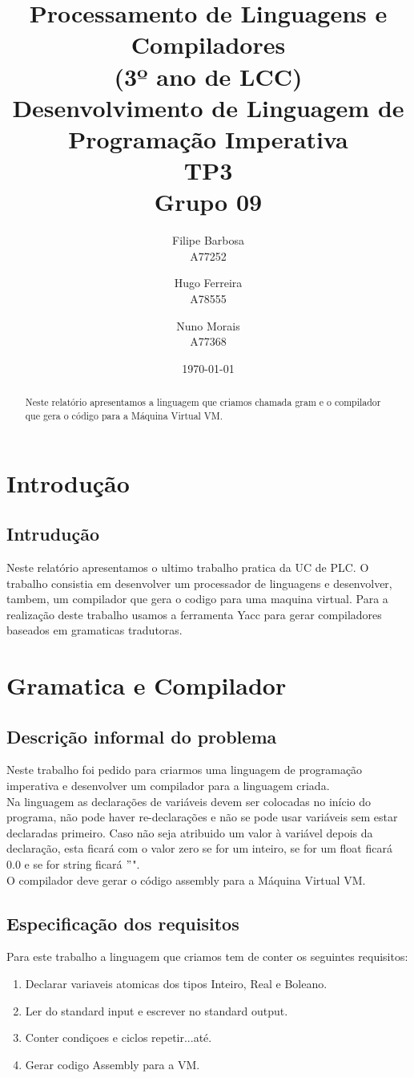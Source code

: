 \documentclass{report}
\title{Processamento de Linguagens e Compiladores\\ (3º ano de LCC)\\ \textbf{Desenvolvimento de Linguagem de Programação Imperativa}\\ TP3\\ Grupo 09}
\author{Filipe Barbosa\\ A77252 \and  Hugo Ferreira\\ A78555 \and Nuno Morais\\ A77368 }
\date{\today}
\begin{document}
	
\maketitle
	

\begin{abstract}
	Neste relatório apresentamos a linguagem que criamos chamada gram e o compilador que gera o código para a Máquina Virtual VM.
\end{abstract}

\tableofcontents

\chapter{Introdução} \label{intro}
\section{Intrudução}
\indent
Neste relatório apresentamos o ultimo trabalho pratica da UC de PLC. O trabalho consistia em desenvolver um processador de linguagens e desenvolver, tambem, um compilador que gera o codigo para uma maquina virtual. Para a realização deste trabalho usamos a ferramenta Yacc para gerar compiladores baseados em gramaticas tradutoras.

\chapter{Gramatica e Compilador} \label{fi}
\section{Descrição informal do problema}
\indent
Neste trabalho foi pedido para criarmos uma linguagem de programação imperativa e desenvolver um compilador para a linguagem criada.\\
\indent
Na linguagem as declarações de variáveis devem ser colocadas no início do programa, não pode haver re-declarações e não se pode usar variáveis sem estar declaradas primeiro. Caso não seja atribuido um valor à variável depois da declaração, esta ficará com o valor zero se for um inteiro, se for um float ficará 0.0 e se for string ficará $"$".\\
\indent  	
O compilador deve gerar o código assembly para a Máquina Virtual VM.

\section{Especificação dos requisitos}
\indent
Para este trabalho a linguagem que criamos tem de conter os seguintes requisitos:
\begin{enumerate}
	\item Declarar variaveis atomicas dos tipos Inteiro, Real e Boleano.
	\item Ler do standard input e escrever no standard output.
	\item Conter condiçoes e ciclos repetir...até.
    \item Gerar codigo Assembly para a VM.
\end{enumerate}
\end{document}
